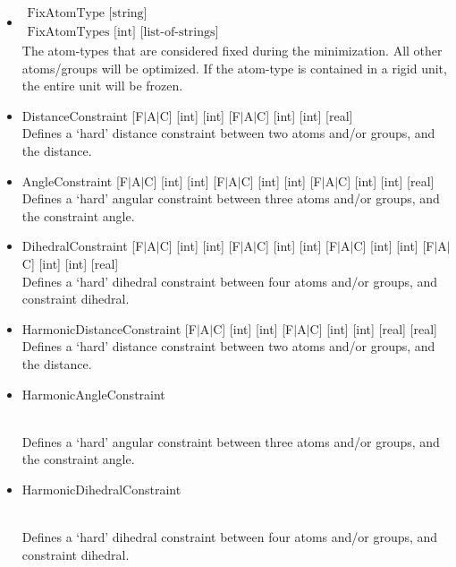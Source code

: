 \begin{itemize}
\item{$\begin{array}{l}\text{FixAtomType [string]}\\\text{FixAtomTypes [int] [list-of-strings]}\end{array}$}\\
The atom-types that are considered fixed during the minimization. All other atoms/groups will be optimized.
If the atom-type is contained in a rigid unit, the entire unit will be frozen.
\item{DistanceConstraint [F$|$A$|$C] [int] [int] [F$|$A$|$C] [int] [int] [real]}\\
Defines a `hard' distance constraint between two atoms and/or groups, and the distance.
\item{AngleConstraint [F$|$A$|$C] [int] [int] [F$|$A$|$C] [int] [int] [F$|$A$|$C] [int] [int] [real]}\\
Defines a `hard' angular constraint between three atoms and/or groups, and the constraint angle.
\item{DihedralConstraint [F$|$A$|$C] [int] [int] [F$|$A$|$C] [int] [int]
    [F$|$A$|$C] [int] [int] [F$|$A$|$C] [int] [int] [real]}\\
Defines a `hard' dihedral constraint between four atoms and/or groups, and constraint dihedral.
\item{HarmonicDistanceConstraint [F$|$A$|$C] [int] [int] [F$|$A$|$C] [int] [int] [real] [real]}\\
Defines a `hard' distance constraint between two atoms and/or groups, and the distance.
\item{HarmonicAngleConstraint \begin{small}[F$|$A$|$C] [int] [int] [F$|$A$|$C] [int] [int] 
  [F$|$A$|$C] [int] [int]  [real] [real]\end{small}}\\
Defines a `hard' angular constraint between three atoms and/or groups, and the constraint angle.
\item{HarmonicDihedralConstraint \begin{footnotesize}[F$|$A$|$C] [int] [int] [F$|$A$|$C] [int] [int]
 [F$|$A$|$C] [int] [int] [F$|$A$|$C] [int] [int] [real] [real]\end{footnotesize}}\\
Defines a `hard' dihedral constraint between four atoms and/or groups, and constraint dihedral.
\end{itemize}


